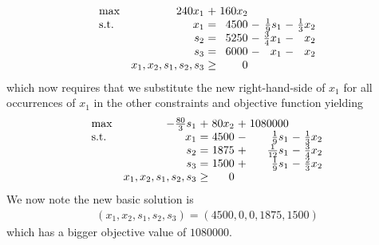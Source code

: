\documentclass{article}
\begin{document}
\begin{equation*}
\setlength\arraycolsep{1.5pt}
  \begin{array}{l@{\quad} r c r c r c r}
    \max          & 240x_1 & + &         160x_2 &      &    \\
    \mathrm{s.t.} & x_1 & = & 4500 & - & \frac{1}{9} s_1 & - & \frac{1}{3}x_2 \\
    & s_2 & = & 5250 & - & \frac{3}{4}x_1 & - & x_2 \\
    & s_3 & = & 6000 & - & x_1 & - & x_2 \\
    & x_1, x_2, s_1, s_2, s_3 & \geq & 0 &&&&  \\
  \end{array}
\end{equation*}
which now requires that we substitute the new right-hand-side of $x_1$ for all occurrences of $x_1$ in the other constraints and objective function yielding
\begin{equation*}
\setlength\arraycolsep{1.5pt}
  \begin{array}{l@{\quad} r c r c r c r}
    \max          & -\frac{80}{3}s_1 & + &         80x_2 &    +  & 1080000    \\
    \mathrm{s.t.} & x_1 & = & 4500 & - & \frac{1}{9} s_1 & - & \frac{1}{3}x_2 \\
    & s_2 & = & 1875 & + & \frac{1}{12}s_1 & - & \frac{3}{4} x_2 \\
    & s_3 & = & 1500 & + & \frac{1}{9}s_1 & - & \frac{2}{3}x_2 \\
    & x_1, x_2, s_1, s_2, s_3 & \geq & 0 &&&&  \\
  \end{array}
\end{equation*}
We now note the new basic solution is
\begin{align*}
    (x_1, x_2, s_1, s_2, s_3) = (4500, 0, 0, 1875, 1500)
\end{align*}
which has a bigger objective value of $1080000$.
\end{document}
